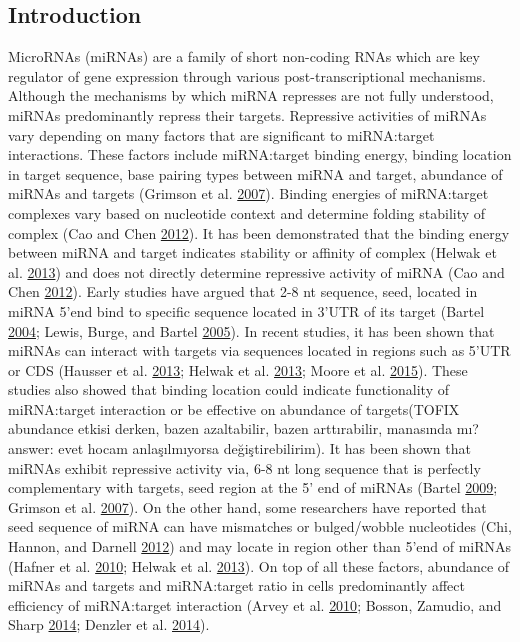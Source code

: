 \documentclass[a4,center,fleqn]{NAR}
\begin{document}
\hypertarget{introduction}{%
\subsection{Introduction}\label{introduction}}

MicroRNAs (miRNAs) are a family of short non-coding RNAs which are key
regulator of gene expression through various post-transcriptional
mechanisms. Although the mechanisms by which miRNA represses are not
fully understood, miRNAs predominantly repress their targets. Repressive
activities of miRNAs vary depending on many factors that are significant
to miRNA:target interactions. These factors include miRNA:target binding
energy, binding location in target sequence, base pairing types between
miRNA and target, abundance of miRNAs and targets (Grimson et al.
\protect\hyperlink{ref-grimson_microrna_2007}{2007}). Binding energies
of miRNA:target complexes vary based on nucleotide context and determine
folding stability of complex (Cao and Chen
\protect\hyperlink{ref-cao_predicting_2012}{2012}). It has been
demonstrated that the binding energy between miRNA and target indicates
stability or affinity of complex (Helwak et al.
\protect\hyperlink{ref-helwak_mapping_2013}{2013}) and does not directly
determine repressive activity of miRNA (Cao and Chen
\protect\hyperlink{ref-cao_predicting_2012}{2012}). Early studies have
argued that 2-8 nt sequence, seed, located in miRNA 5'end bind to
specific sequence located in 3'UTR of its target (Bartel
\protect\hyperlink{ref-bartel_micrornas_2004}{2004}; Lewis, Burge, and
Bartel \protect\hyperlink{ref-lewis_conserved_2005}{2005}). In recent
studies, it has been shown that miRNAs can interact with targets via
sequences located in regions such as 5'UTR or CDS (Hausser et al.
\protect\hyperlink{ref-hausser_analysis_2013}{2013}; Helwak et al.
\protect\hyperlink{ref-helwak_mapping_2013}{2013}; Moore et al.
\protect\hyperlink{ref-moore_mirnatarget_2015}{2015}). These studies
also showed that binding location could indicate functionality of
miRNA:target interaction or be effective on abundance of targets(TOFIX
abundance etkisi derken, bazen azaltabilir, bazen arttırabilir,
manasında mı? answer: evet hocam anlaşılmıyorsa değiştirebilirim). It
has been shown that miRNAs exhibit repressive activity via, 6-8 nt long
sequence that is perfectly complementary with targets, seed region at
the 5' end of miRNAs (Bartel
\protect\hyperlink{ref-bartel_micrornas:_2009}{2009}; Grimson et al.
\protect\hyperlink{ref-grimson_microrna_2007}{2007}). On the other hand,
some researchers have reported that seed sequence of miRNA can have
mismatches or bulged/wobble nucleotides (Chi, Hannon, and Darnell
\protect\hyperlink{ref-chi2012alternative}{2012}) and may locate in
region other than 5'end of miRNAs (Hafner et al.
\protect\hyperlink{ref-hafner_transcriptome-wide_2010}{2010}; Helwak et
al. \protect\hyperlink{ref-helwak_mapping_2013}{2013}). On top of all
these factors, abundance of miRNAs and targets and miRNA:target ratio in
cells predominantly affect efficiency of miRNA:target interaction (Arvey
et al. \protect\hyperlink{ref-arvey_target_2010}{2010}; Bosson, Zamudio,
and Sharp \protect\hyperlink{ref-bosson_endogenous_2014}{2014}; Denzler
et al. \protect\hyperlink{ref-denzler_assessing_2014}{2014}).
\end{document}
